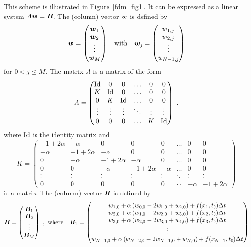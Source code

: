 This scheme is illustrated in Figure~\ref{fdm_fig1}.  It can be
expressed as a linear system $A \bm{w} = \bm{B}$.  The (column)
vector $\bm{w}$ is defined by
\[ \bm{w} = \begin{pmatrix} \bm{w}_1 \\ \bm{w}_2 \\ \vdots \\
\bm{w}_{M}
\end{pmatrix} \quad \text{with} \quad \bm{w}_j =
\begin{pmatrix} w_{1,j} \\ w_{2,j} \\ \vdots \\
w_{N-1,j} \end{pmatrix}
\]
for $0 <j \leq M$. The matrix $A$ is
a  matrix of the form 
\[
A = \begin{pmatrix}
\operatorname{Id} & 0 & 0 & \ldots & 0 & 0 \\
K & \operatorname{Id} & 0 & \ldots & 0 & 0 \\
0 & K & \operatorname{Id} & \ldots & 0 & 0 \\
\vdots & \vdots & \vdots & \ddots & \vdots & \vdots \\
0 & 0 & 0 & \ldots & K & \operatorname{Id}
\end{pmatrix} \ ,
\]
where $\operatorname{Id}$ is the  identity matrix and
\begin{equation} \label{fdm_K}
K = \begin{pmatrix}
-1+2\alpha & -\alpha & 0 & 0 & 0 & \ldots & 0 & 0 \\
-\alpha & -1 +2\alpha & -\alpha & 0 & 0 & \ldots & 0 & 0  \\
0 & -\alpha & -1 +2\alpha & -\alpha & 0 & \ldots & 0 & 0 \\
0 & 0 & -\alpha & -1 +2\alpha & -\alpha & \ldots & 0 & 0 \\
\vdots & \vdots & \vdots & \vdots & \vdots & \ddots & \vdots & \vdots \\
0 & 0 & 0 & 0 & 0 & \cdots & -\alpha & -1+2\alpha
\end{pmatrix}
\end{equation}
is a  matrix.  The (column) vector $\bm{B}$ is defined by
\[
\bm{B} = \begin{pmatrix} \bm{B}_1 \\ \bm{B}_2 \\ \vdots \\
\bm{B}_M \end{pmatrix} \ , \ \text{where} \quad
\bm{B}_1 = \begin{pmatrix} 
w_{1,0} + \alpha \left( w_{0,0} - 2 w_{1,0} + w_{2,0}\right)
+ f(x_1,t_0) \Delta{t} \\
w_{2,0} + \alpha \left( w_{1,0} - 2 w_{2,0} + w_{3,0}\right)
+ f(x_2,t_0) \Delta{t} \\
w_{3,0} + \alpha \left( w_{2,0} - 2 w_{3,0} + w_{4,0}\right)
+ f(x_3,t_0) \Delta{t} \\
\vdots \\
w_{N-1,0} + \alpha \left( w_{N-2,0} - 2 w_{N-1,0} + w_{N,0}\right)
+ f(x_{N-1},t_0) \Delta{t}
\end{pmatrix}
\]
